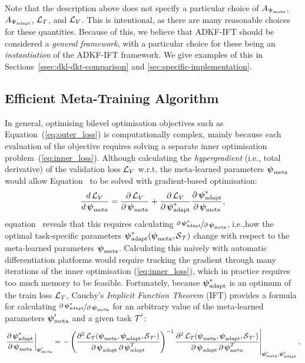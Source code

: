     Note that the description above does not specify a particular choice of
    $A_{\Psimeta}$, $A_{\Psiml}$, $\loss_T$, and $\loss_V$.
    This is intentional, as there are many reasonable choices for these quantities.
    Because of this, we believe that ADKF-IFT should be considered a \emph{general framework},
    with a particular choice for these
    being an \emph{instantiation} of the ADKF-IFT framework.
    We give examples of this in Sections~\ref{ssec:dkl-dkt-comparison} and \ref{sec:specific-implementation}.
    
    
    \subsection{Efficient Meta-Training Algorithm}\label{ssec:ift}
    
    In general, optimising bilevel optimisation objectives such as Equation~(\ref{eq:outer_loss}) is computationally complex,
    mainly because each evaluation of the objective requires solving a separate inner optimisation problem~(\ref{eq:inner_loss}).
    Although calculating the \emph{hypergradient} (i.e., total derivative) of the validation loss $\loss_V$ w.r.t. the meta-learned parameters $\psimeta$ would allow Equation~ to be solved with gradient-based optimisation:
    \begin{align}
        \frac{d\loss_V}{d\psimeta}=\frac{\partial \loss_V}{\partial\psimeta}+\frac{\partial \loss_V}{\partial \psiml^*} \frac{\partial\psiml^*}{\partial\psimeta},\label{eq:hypergrad}
    \end{align}
    equation~ reveals that this requires calculating $\nicefrac{\partial\psiml^*}{\partial\psimeta}$,
    i.e.,\@ how the optimal task-specific parameters $\psiml^*(\psimeta,\support_{\task})$ change with respect to the meta-learned parameters $\psimeta$.
    Calculating this naively with automatic differentiation platforms would require tracking the gradient through many iterations of the inner optimisation (\ref{eq:inner_loss}),
    which in practice requires too much memory to be feasible.
    Fortunately, because $\psiml^*$ is an optimum of the train loss $\loss_T$, Cauchy's \emph{Implicit Function Theorem} (IFT) provides a formula for calculating $\nicefrac{\partial\psiml^*}{\partial\psimeta}$ for an arbitrary value of the meta-learned parameters $\psimeta'$ and a given task $\task'$:
    \begin{align}
        \left.\frac{\partial\psiml^*
        }{\partial\psimeta}\right\vert_{\psimeta'} = \left.-\left( \frac{\partial^2\loss_T(\psimeta,\psiml,\support_{\task'} )}{\partial\psiml\partial\psiml^T} \right)^{-1}\frac{\partial^2\loss_T(\psimeta,\psiml,\support_{\task'} )}{\partial\psiml\partial\psimeta^T}\right\vert_{\psimeta',\psiml'},\label{eq:cauchy ift}
    \end{align}
